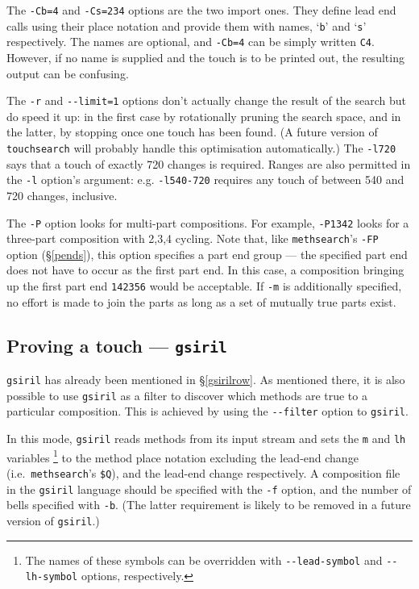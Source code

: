 \documentclass[a4paper,11pt,oneside]{book}
\makeatletter
\newcommand{\ttcmdidx}[1]{\texttt{#1}\index{#1@{\texttt{#1}}}}
\def\methsearch{\texttt{meth\-search}}
\newcommand{\sref}[1]{\hyperref[#1]{\S\ref{#1}}}
\makeatother
\begin{document}
The \verb+-Cb=4+ and \verb+-Cs=234+ options are the two import ones.  
They define lead end calls using their place notation 
and provide them with names, `\verb+b+' and `\verb+s+' respectively.  
The names are optional, and \verb+-Cb=4+ can be simply written \verb+C4+.  
However, if no name is supplied and the touch is to be printed out, 
the resulting output can be confusing.

The \verb+-r+ and \verb+--limit=1+ options don't actually change the 
result of the search but do speed it up: in the first case by rotationally
pruning the search space, and in the latter, by stopping once one touch 
has been found.  (A future version of \texttt{touchsearch} will probably
handle this optimisation automatically.)
The \verb+-l720+ says that a touch of exactly 720 changes is required.  
Ranges are also permitted in the \verb+-l+ option's argument: e.g.
\verb+-l540-720+ requires any touch of between 540 and 720 changes, inclusive.

The \verb+-P+ option looks for multi-part compositions.  For 
example, \verb+-P1342+ looks for a three-part composition with 2,3,4 cycling.
Note that, like \methsearch's \verb+-FP+ option (\sref{pends}), this option
specifies a part end group 
— the specified part end does not have to occur as the first part end.
In this case, a composition bringing up 
the first part end \verb+142356+ would be acceptable.
If \verb+-m+ is 
additionally specified, no effort is made to join the parts as long
as a set of mutually true parts exist.

\subsection{Proving a touch — \texttt{gsiril}}\label{gsirilmeth}

\ttcmdidx{gsiril} has already been mentioned in \sref{gsirilrow}.  As
mentioned there, it is also possible to use \texttt{gsiril} as a filter
to discover which methods are true to a particular composition.   This
is achieved by using the \verb+--filter+ option to \texttt{gsiril}.

In this mode, \texttt{gsiril} reads methods from its input stream
and sets the \verb+m+ and \verb+lh+ variables%
\footnote{The names of these symbols can be overridden with             
\verb+--lead-symbol+ and \verb+--lh-symbol+ options, respectively.}
to the method place notation excluding the lead-end change 
(i.e.\ \methsearch's \verb+$Q+),  and the lead-end change respectively.
A composition file in the \texttt{gsiril} language should be specified with 
the \verb+-f+ option, and the number of bells specified with \verb+-b+.  
(The latter requirement is likely to be removed in a future version of 
\texttt{gsiril}.)
\end{document}
